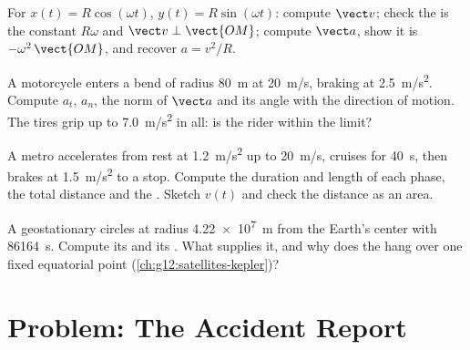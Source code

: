 \begin{exercise}[$\star\star\star$]\label{exo:g12:kinematics-2d:12}
For $x(t) = R\cos(\omega t)$, $y(t) = R\sin(\omega t)$: compute
$\vect v$; check the  is the constant $R\omega$ and
$\vect v \perp \vect{OM}$; compute $\vect a$, show it is
$-\omega^2\,\vect{OM}$, and recover $a = v^2/R$.
\end{exercise}

\begin{exercise}[$\star\star\star$]\label{exo:g12:kinematics-2d:13}
A motorcycle enters a bend of radius \qty{80}{m} at \qty{20}{m/s},
braking at \qty{2.5}{m/s^2}. Compute $a_t$, $a_n$, the norm of
$\vect a$ and its angle with the direction of motion. The tires grip
up to \qty{7.0}{m/s^2} in all: is the rider within the limit?
\end{exercise}

\begin{exercise}[$\star\star\star$]\label{exo:g12:kinematics-2d:14}
A metro accelerates from rest at \qty{1.2}{m/s^2} up to \qty{20}{m/s},
cruises for \qty{40}{s}, then brakes at \qty{1.5}{m/s^2} to a stop.
Compute the duration and length of each phase, the total distance and
the . Sketch $v(t)$ and check the distance as an area.
\end{exercise}

\begin{exercise}[$\star\star\star$]\label{exo:g12:kinematics-2d:15}
A geostationary  circles at radius \qty{4.22e7}{m} from the
Earth's center with  \qty{86164}{s}. Compute its  and its
. What supplies it, and why does the 
hang over one fixed equatorial point (\cref{ch:g12:satellites-kepler})?
\end{exercise}

\section{Problem: The Accident Report}

